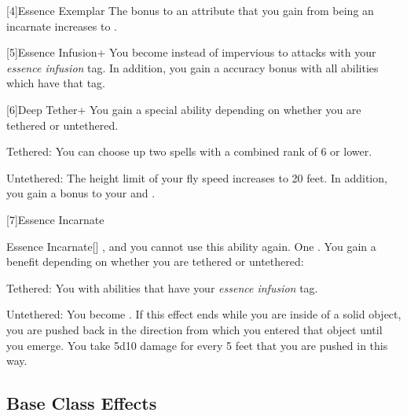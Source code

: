     [4]{Essence Exemplar} The bonus to an attribute that you gain from being an incarnate increases to .

    [5]{Essence Infusion+} You become  instead of impervious to attacks with your \textit{essence infusion} tag.
      In addition, you gain a  accuracy bonus with all abilities which have that tag.

    [6]{Deep Tether+} You gain a special ability depending on whether you are tethered or untethered.
      \begin{raggeditemize}
        \item Tethered: You can choose up two spells with a combined rank of 6 or lower.
        \item Untethered: The height limit of your fly speed increases to 20 feet.
          In addition, you gain a  bonus to your  and .
      \end{raggeditemize}

    [7]{Essence Incarnate}
      \begin{magicalactiveability}{Essence Incarnate}[]
        \abilityusagetime {}, and you  cannot use this ability again.
        \abilitycost One .
        \rankline
        You gain a benefit depending on whether you are tethered or untethered:
        \begin{raggeditemize}
          \item Tethered: You  \primed with abilities that have your \textit{essence infusion} tag.
          \item Untethered: You  become .
            If this effect ends while you are inside of a solid object, you are pushed back in the direction from which you entered that object until you emerge.
            You take 5d10 damage for every 5 feet that you are pushed in this way.
        \end{raggeditemize}

        {}
      \end{magicalactiveability}

  \subsection{Base Class Effects}
    \highhpprogressiontable

